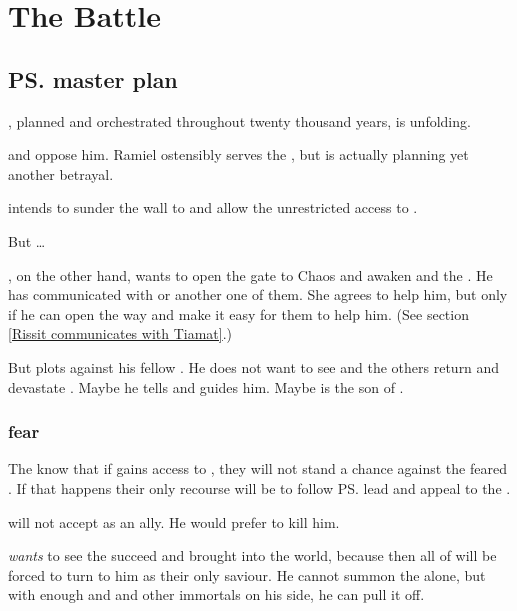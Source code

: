 \section{The \Matrices Battle}









\subsection{\ps{\Daggerrain} master plan}
, planned and orchestrated throughout twenty thousand years, is unfolding. 

\Secherdamon{} and \Ishnaruchaefir{} oppose him. Ramiel ostensibly serves the \banes, but is actually planning yet another betrayal.

\Daggerrain{} intends to sunder the wall to \Erebos{} and allow the \Voidbringer{} unrestricted access to \Miith{}. 

But \ldots{}

\Secherdamon, on the other hand, wants to open the gate to Chaos and awaken \Tiamat{} and the \firstgendragons. He has communicated with \KhothSell{} or another one of them. She agrees to help him, but only if he can open the way and make it easy for them to help him. (See section \ref{Rissit communicates with Tiamat}.)

But \Iurzmacul{} plots against his fellow \firstgendragons{}. He does not want to see \Tiamat{} and the others return and devastate \Miith{}. Maybe he tells \Ishnaruchaefir{} and guides him. Maybe \Ishnaruchaefir{} is the son of \Iurzmacul.





\subsubsection{\Dragons fear \Voidbringer}
The \dragons{} know that if \Voidbringer{} gains access to \Miith, they will not stand a chance against the feared \baneking. 
If that happens their only recourse will be to follow \ps{\Vizsherioch} lead and appeal to the \xss. 

\Vizsherioch{} will not accept \Ishnaruchaefir{} as an ally. 
He would prefer to kill him. 

\Vizsherioch{} \emph{wants} to see the \banes{} succeed and \Voidbringer{} brought into the world, because then all of \Miith{} will be forced to turn to him as their only saviour. 
He cannot summon the \xss{} alone, but with enough \dragons{} and \quiljaaran{} and other immortals on his side, he can pull it off. 

